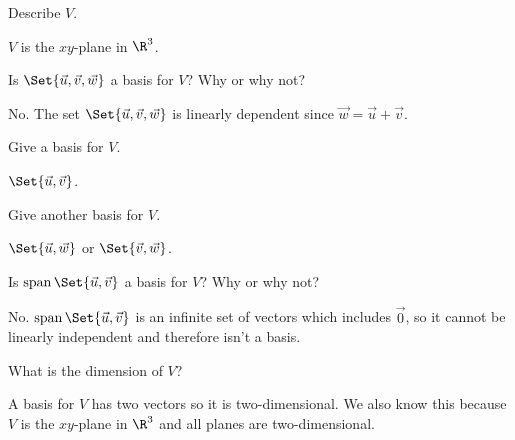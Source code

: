 \documentclass{problemset}
\begin{document}
	\begin{parts}
		\item Describe $V$.
			\begin{solution}[inline]
				$V$ is the $xy$-plane in $\R^3$.
			\end{solution}
		\item Is $\Set{\vec u,\vec v,\vec w}$ a basis for $V$?  Why or why not?
			\begin{solution}
				No. The set $\Set{\vec u,\vec v,\vec w}$ is linearly dependent since $\vec w=\vec u+\vec v$.
			\end{solution}
		\item Give a basis for $V$.
			\begin{solution}[inline]
				$\Set{\vec u,\vec v}$.
			\end{solution}
		\item Give another basis for $V$.
			\begin{solution}[inline]
				$\Set{\vec u,\vec w}$ or $\Set{\vec v,\vec w}$.
			\end{solution}
		\item Is $\Span\Set{\vec u,\vec v}$ a basis for $V$?  Why or why not?
			\begin{solution}
				No. $\Span\Set{\vec u,\vec v}$ is an infinite set of vectors
				which includes $\vec 0$, so it cannot be linearly independent and
				therefore isn't a basis.
			\end{solution}
		\item What is the dimension of $V$?
			\begin{solution}
				A basis for $V$ has two vectors so it is two-dimensional. We also
				know this because $V$ is the $xy$-plane in $\R^3$ and all planes
				are two-dimensional.
			\end{solution}
	\end{parts}
\end{document}
